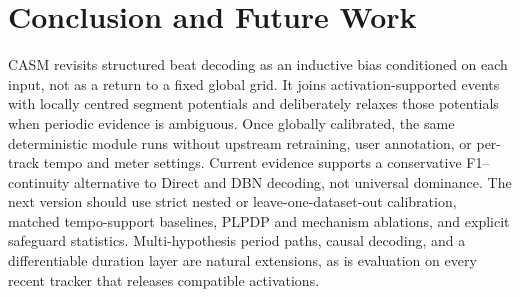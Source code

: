 \documentclass{article}
\begin{document}
\section{Conclusion and Future Work}
\label{sec:concl}

CASM revisits structured beat decoding as an inductive bias conditioned on each input, not as a return to a fixed global grid. It joins activation-supported events with locally centred segment potentials and deliberately relaxes those potentials when periodic evidence is ambiguous. Once globally calibrated, the same deterministic module runs without upstream retraining, user annotation, or per-track tempo and meter settings. Current evidence supports a conservative F1--continuity alternative to Direct and DBN decoding, not universal dominance. The next version should use strict nested or leave-one-dataset-out calibration, matched tempo-support baselines, PLPDP and mechanism ablations, and explicit safeguard statistics. Multi-hypothesis period paths, causal decoding, and a differentiable duration layer are natural extensions, as is evaluation on every recent tracker that releases compatible activations.



\end{document}
